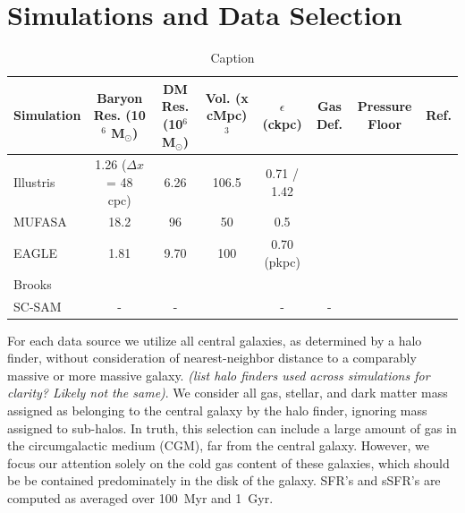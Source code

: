 \documentclass[fleqn,usenatbib]{mnras}
\begin{document}

\section{Simulations and Data Selection}
\begin{table}
\centering
\caption{Caption}
\label{table:simulations}
  \begin{tabular}{l c c c c c c c}
  \hline
  Simulation & Baryon Res. (10$^6$ M$_{\odot}$) & DM Res. (10$^6$ M$_{\odot}$) & Vol. (x cMpc)$^3$ & $\epsilon$ (ckpc) & Gas Def. & Pressure Floor & Ref. \\
  \hline 
  Illustris  & 1.26 ($\Delta x$ = 48 cpc) & 6.26 & 106.5 & 0.71 / 1.42 & &  & \citep{Vogelsberger2014} \\
  MUFASA & 18.2 & 96 & 50 & 0.5 & & & \citep{Dave2016} \\
  EAGLE  & 1.81 &  9.70  & 100 & 0.70 (pkpc) & &  & \citep{Schaye2015,Crain2015} \\
  Brooks & & &  & & & & \\
  SC-SAM & -  & - & & - & - & & \citep{Somerville2012,Porter2014}\\
  \hline
  \end{tabular}
  
\end{table}

For each data source we utilize all central galaxies, as determined by a halo finder, without consideration of nearest-neighbor distance to a comparably massive or more massive galaxy. {\it (list halo finders used across simulations for clarity? Likely not the same)}. We consider all gas, stellar, and dark matter mass assigned as belonging to the central galaxy by the halo finder, ignoring mass assigned to sub-halos. In truth, this selection can include a large amount of gas in the circumgalactic medium (CGM), far from the central galaxy. However, we focus our attention solely on the cold gas content of these galaxies, which should be be contained predominately in the disk of the galaxy. SFR's and sSFR's are computed as averaged over 100~Myr and 1~Gyr.
\end{document}
